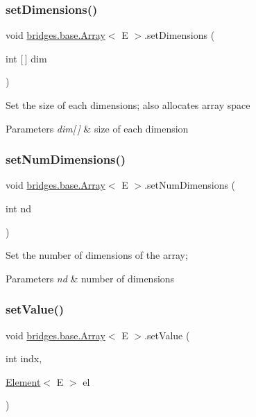 \subsubsection{\texorpdfstring{set\+Dimensions()}{setDimensions()}}
{\footnotesize\ttfamily void \hyperlink{classbridges_1_1base_1_1_array}{bridges.\+base.\+Array}$<$ E $>$.set\+Dimensions (\begin{DoxyParamCaption}\item[{int \mbox{[}$\,$\mbox{]}}]{dim }\end{DoxyParamCaption})}

Set the size of each dimensions; also allocates array space


\begin{DoxyParams}{Parameters}
{\em dim\mbox{[}$\,$\mbox{]}} & size of each dimension \\
\hline
\end{DoxyParams}
\hypertarget{classbridges_1_1base_1_1_array_ab7859668a25d16adfdb308e24c7d44c6}{}\label{classbridges_1_1base_1_1_array_ab7859668a25d16adfdb308e24c7d44c6} 
\subsubsection{\texorpdfstring{set\+Num\+Dimensions()}{setNumDimensions()}}
{\footnotesize\ttfamily void \hyperlink{classbridges_1_1base_1_1_array}{bridges.\+base.\+Array}$<$ E $>$.set\+Num\+Dimensions (\begin{DoxyParamCaption}\item[{int}]{nd }\end{DoxyParamCaption})}

Set the number of dimensions of the array;


\begin{DoxyParams}{Parameters}
{\em nd} & number of dimensions \\
\hline
\end{DoxyParams}
\hypertarget{classbridges_1_1base_1_1_array_af2d5b5e252f35e740ff4d89c22089ece}{}\label{classbridges_1_1base_1_1_array_af2d5b5e252f35e740ff4d89c22089ece} 
\subsubsection{\texorpdfstring{set\+Value()}{setValue()}\hspace{0.1cm}{\footnotesize\ttfamily [1/3]}}
{\footnotesize\ttfamily void \hyperlink{classbridges_1_1base_1_1_array}{bridges.\+base.\+Array}$<$ E $>$.set\+Value (\begin{DoxyParamCaption}\item[{int}]{indx,  }\item[{\hyperlink{classbridges_1_1base_1_1_element}{Element}$<$ E $>$}]{el }\end{DoxyParamCaption})}

